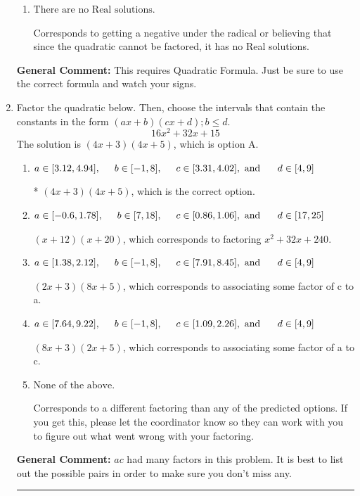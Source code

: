 \documentclass{extbook}[14pt]
\newcommand{\litem}[1]{\item #1

\rule{\textwidth}{0.4pt}}
\begin{document}
\begin{enumerate}
{\begin{enumerate}[label=\Alph*.]
* $x_1 = -1.155 \text{ and } x_2 = 0.289$, which is the correct option.
\item \( \text{There are no Real solutions.} \)

Corresponds to getting a negative under the radical or believing that since the quadratic cannot be factored, it has no Real solutions.
\end{enumerate}

\textbf{General Comment:} This requires Quadratic Formula. Just be sure to use the correct formula and watch your signs.
}
\litem{
Factor the quadratic below. Then, choose the intervals that contain the constants in the form $(ax+b)(cx+d); b \leq d.$
\[ 16x^{2} +32 x + 15 \]
The solution is \( (4x + 3)(4x + 5) \), which is option A.\begin{enumerate}[label=\Alph*.]
\item \( a \in [3.12, 4.94], \hspace*{5mm} b \in [-1, 8], \hspace*{5mm} c \in [3.31, 4.02], \text{ and } \hspace*{5mm} d \in [4, 9] \)

* $(4x + 3)(4x + 5)$, which is the correct option.
\item \( a \in [-0.6, 1.78], \hspace*{5mm} b \in [7, 18], \hspace*{5mm} c \in [0.86, 1.06], \text{ and } \hspace*{5mm} d \in [17, 25] \)

 $(x + 12)(x + 20)$, which corresponds to factoring $x^{2} +32 x + 240$.
\item \( a \in [1.38, 2.12], \hspace*{5mm} b \in [-1, 8], \hspace*{5mm} c \in [7.91, 8.45], \text{ and } \hspace*{5mm} d \in [4, 9] \)

 $(2x + 3)(8x + 5)$, which corresponds to associating some factor of c to a.
\item \( a \in [7.64, 9.22], \hspace*{5mm} b \in [-1, 8], \hspace*{5mm} c \in [1.09, 2.26], \text{ and } \hspace*{5mm} d \in [4, 9] \)

 $(8x + 3)(2x + 5)$, which corresponds to associating some factor of a to c.
\item \( \text{None of the above.} \)

 Corresponds to a different factoring than any of the predicted options. If you get this, please let the coordinator know so they can work with you to figure out what went wrong with your factoring.
\end{enumerate}

\textbf{General Comment:} $ac$ had many factors in this problem. It is best to list out the possible pairs in order to make sure you don't miss any.
}
\end{enumerate}
\end{document}
